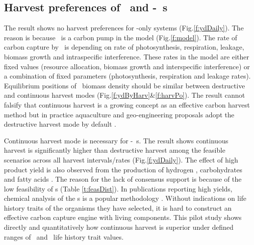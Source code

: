 \documentclass[../thesis.tex]{subfiles} %
\begin{document}
\subsection{Harvest preferences of \phy\ and \phy-\bac\ \pbs s}
The result shows no harvest preferences for \phy-only systems (Fig.\ref{f:ydDaily}).  The reason is because \phy\ is a carbon pump in the model (Fig.\ref{f:model}).  The rate of carbon capture by \phy\ is depending on rate of photosynthesis, respiration, leakage, biomass growth and intraspecific interference.  These rates in the model are either fixed values (resource allocation, biomass growth and interspecific interference) or a combination of fixed parameters (photosynthesis, respiration and leakage rates).  Equilibrium positions of \phy\ biomass density should be similar between destructive and continuous harvest modes (Fig.\ref{f:ydByHarv}\&\ref{f:harvPo}).  The result cannot falsify that continuous harvest is a growing concept as an effective carbon harvest method \autocite{fuentes2016impact} but in practice aquaculture and geo-engineering proposals adopt the destructive harvest mode by default \autocite{lawrence2014efficiency,krause2016substantial}.

Continuous harvest mode is necessary for \phy-\bac\ \pbs s.  The result shows continuous harvest is significantly higher than destructive harvest among the feasible scenarios across all harvest intervals/rates (Fig.\ref{f:ydDaily}).  The effect of high product yield is also observed from the production of hydrogen \autocite{kim2008anaerobic}, carbohydrates \autocite{choix2012enhanced1,choix2012enhanced2} and fatty acids \autocite{leyva2014accumulation}.  The reason for the lack of consensus support is because of the low feasibility of \pbs s (Table \ref{t:feasDist}).  In publications reporting high yields, chemical analysis of the \pbs s is a popular methodology \autocite{santos2014microalgal,rivas2010interactions,leyva2014accumulation,amin2009photolysis}.  Without indications on life history traits of the organisms they have selected, it is hard to construct an effective carbon capture engine with living components.  This pilot study shows directly and quantitatively how continuous harvest is superior under defined ranges of \phy\ and \bac\ life history trait values.
\end{document}

